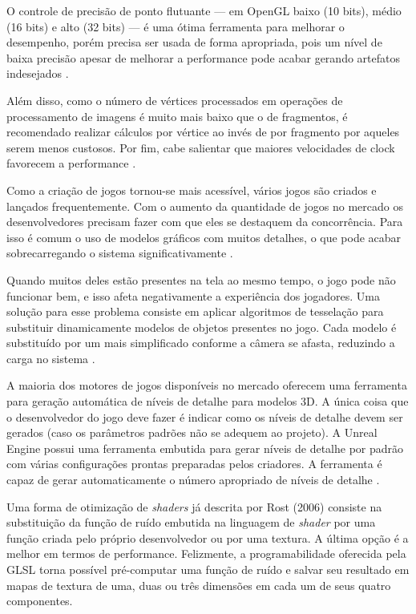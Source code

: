 O controle de precisão de ponto flutuante --- em OpenGL baixo (10 bits), médio (16 bits) e alto (32 bits) --- é uma ótima ferramenta para melhorar o desempenho, porém precisa ser usada de forma apropriada, pois um nível de baixa precisão apesar de melhorar a performance pode acabar gerando artefatos indesejados \cite{optimizationMobile}.

Além disso, como o número de vértices processados em operações de processamento de imagens é muito mais baixo que o de fragmentos, é recomendado realizar cálculos por vértice ao invés de por fragmento por aqueles serem menos custosos. Por fim, cabe salientar que maiores velocidades de clock favorecem a performance \cite{optimizationMobile}.

Como a criação de jogos tornou-se mais acessível, vários jogos são criados e lançados frequentemente. Com o aumento da quantidade de jogos no mercado os desenvolvedores precisam fazer com que eles se destaquem da concorrência. Para isso é comum o uso de modelos gráficos com muitos detalhes, o que pode acabar sobrecarregando o sistema significativamente \cite{performanceTesselation}. 

Quando muitos deles estão presentes na tela ao mesmo tempo, o jogo pode não funcionar bem, e isso afeta negativamente a experiência dos jogadores. Uma solução para esse problema consiste em aplicar algoritmos de tesselação para substituir dinamicamente modelos de objetos presentes no jogo. Cada modelo é substituído por um mais simplificado conforme a câmera se afasta, reduzindo a carga no sistema \cite{performanceTesselation}.

A maioria dos motores de jogos disponíveis no mercado oferecem uma ferramenta para geração automática de níveis de detalhe para modelos 3D. A única coisa que o desenvolvedor do jogo deve fazer é indicar como os níveis de detalhe devem ser gerados (caso os parâmetros padrões não se adequem ao projeto). A Unreal Engine possui uma ferramenta embutida para gerar níveis de detalhe por padrão com várias configurações prontas preparadas pelos criadores. A ferramenta é capaz de gerar automaticamente o número apropriado de níveis de detalhe \cite{performanceTesselation}.

Uma forma de otimização de \textit{shaders} já descrita por Rost (2006) consiste na substituição da função de ruído embutida na linguagem de \textit{shader} por uma função criada pelo próprio desenvolvedor ou por uma textura. A última opção é a melhor em termos de performance. Felizmente, a programabilidade oferecida pela GLSL torna possível pré-computar uma função de ruído e salvar seu resultado em mapas de textura de uma, duas ou três dimensões em cada um de seus quatro componentes.

